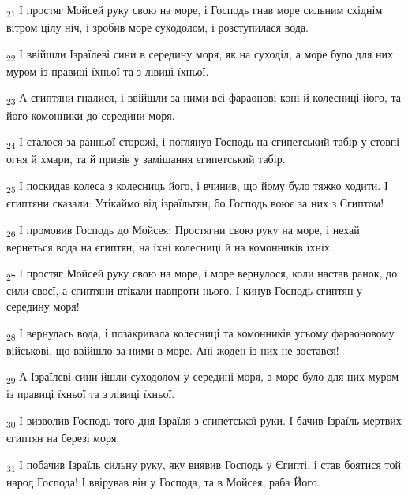 \begin{tcolorbox}
\textsubscript{21} І простяг Мойсей руку свою на море, і Господь гнав море сильним східнім вітром цілу ніч, і зробив море суходолом, і розступилася вода.
\end{tcolorbox}
\begin{tcolorbox}
\textsubscript{22} І ввійшли Ізраїлеві сини в середину моря, як на суходіл, а море було для них муром із правиці їхньої та з лівиці їхньої.
\end{tcolorbox}
\begin{tcolorbox}
\textsubscript{23} А єгиптяни гналися, і ввійшли за ними всі фараонові коні й колесниці його, та його комонники до середини моря.
\end{tcolorbox}
\begin{tcolorbox}
\textsubscript{24} І сталося за ранньої сторожі, і поглянув Господь на єгипетський табір у стовпі огня й хмари, та й привів у замішання єгипетський табір.
\end{tcolorbox}
\begin{tcolorbox}
\textsubscript{25} І поскидав колеса з колесниць його, і вчинив, що йому було тяжко ходити. І єгиптяни сказали: Утікаймо від ізраїльтян, бо Господь воює за них з Єгиптом!
\end{tcolorbox}
\begin{tcolorbox}
\textsubscript{26} І промовив Господь до Мойсея: Простягни свою руку на море, і нехай вернеться вода на єгиптян, на їхні колесниці й на комонників їхніх.
\end{tcolorbox}
\begin{tcolorbox}
\textsubscript{27} І простяг Мойсей руку свою на море, і море вернулося, коли настав ранок, до сили своєї, а єгиптяни втікали навпроти нього. І кинув Господь єгиптян у середину моря!
\end{tcolorbox}
\begin{tcolorbox}
\textsubscript{28} І вернулась вода, і позакривала колесниці та комонників усьому фараоновому військові, що ввійшло за ними в море. Ані жоден із них не зостався!
\end{tcolorbox}
\begin{tcolorbox}
\textsubscript{29} А Ізраїлеві сини йшли суходолом у середині моря, а море було для них муром із правиці їхньої та з лівиці їхньої.
\end{tcolorbox}
\begin{tcolorbox}
\textsubscript{30} І визволив Господь того дня Ізраїля з єгипетської руки. І бачив Ізраїль мертвих єгиптян на березі моря.
\end{tcolorbox}
\begin{tcolorbox}
\textsubscript{31} І побачив Ізраїль сильну руку, яку виявив Господь у Єгипті, і став боятися той народ Господа! І ввірував він у Господа, та в Мойсея, раба Його.
\end{tcolorbox}

